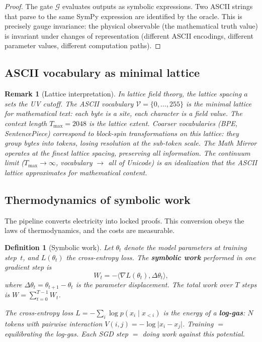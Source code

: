 \documentclass[11pt,a4paper]{article}
\newtheorem{definition}[theorem]{Definition}
\newtheorem{remark}[theorem]{Remark}
\newcommand{\cV}{\mathcal{V}}
\newcommand{\cG}{\mathcal{G}}
\newcommand{\ip}[2]{\langle #1, #2 \rangle}
\newcommand{\abs}[1]{\lvert #1 \rvert}
\begin{document}
\begin{proof}
The gate $\cG$ evaluates outputs as symbolic expressions.
Two ASCII strings that parse to the same SymPy expression
are identified by the oracle.
This is precisely gauge invariance: the physical observable
(the mathematical truth value) is invariant under changes
of representation (different ASCII encodings, different
parameter values, different computation paths).
\end{proof}

\subsection{ASCII vocabulary as minimal lattice}

\begin{remark}[Lattice interpretation]\label{rem:lattice}
In lattice field theory, the lattice spacing $a$ sets the
UV cutoff.
The ASCII vocabulary $\cV = \{0, \ldots, 255\}$ is the
minimal lattice for mathematical text: each byte is a site,
each character is a field value.
The context length $T_{\max} = 2048$ is the lattice extent.
Coarser vocabularies (BPE, SentencePiece) correspond to
block-spin transformations on this lattice: they group bytes
into tokens, losing resolution at the sub-token scale.
The Math Mirror operates at the finest lattice spacing,
preserving all information.
The continuum limit ($T_{\max} \to \infty$, vocabulary $\to$
all of Unicode) is an idealization that the ASCII lattice
approximates for mathematical content.
\end{remark}

\subsection{Thermodynamics of symbolic work}\label{sec:thermo}

The pipeline converts electricity into locked proofs.
This conversion obeys the laws of thermodynamics,
and the costs are measurable.

\begin{definition}[Symbolic work]\label{def:sym-work}
Let $\theta_t$ denote the model parameters at training step~$t$,
and $L(\theta_t)$ the cross-entropy loss.
The \textbf{symbolic work} performed in one gradient step is
\begin{equation}\label{eq:work}
  W_t = -\ip{\nabla L(\theta_t)}{\Delta\theta_t},
\end{equation}
where $\Delta\theta_t = \theta_{t+1} - \theta_t$ is the
parameter displacement.
The total work over $T$ steps is $W = \sum_{t=0}^{T-1} W_t$.

The cross-entropy loss $L = -\sum_i \log p(x_i \mid x_{<i})$
is the energy of a \textbf{log-gas}: $N$ tokens with pairwise
interaction $V(i,j) = -\log\abs{x_i - x_j}$.
Training $=$ equilibrating the log-gas.
Each SGD step $=$ doing work against this potential.
\end{definition}
\end{document}
